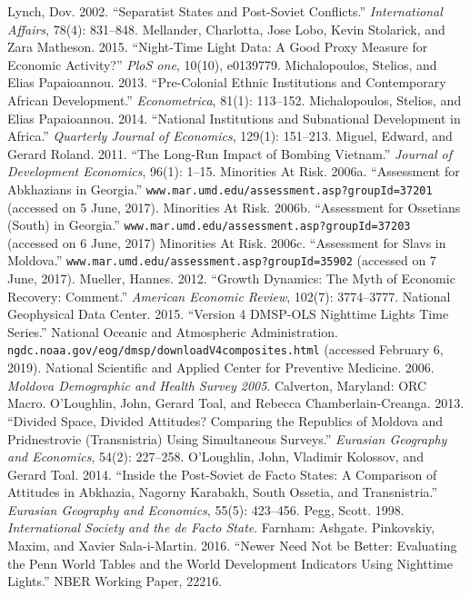 \documentclass[12pt,a4paper]{article}%
\begin{document}
\begin{thebibliography}{99}
\bibitem{} Lynch, Dov. 2002. ``Separatist States and Post-Soviet Conflicts.'' \textit{International Affairs}, 78(4): 831--848.
\bibitem{} Mellander, Charlotta, Jose Lobo, Kevin Stolarick, and Zara Matheson. 2015. ``Night-Time Light Data: A Good Proxy Measure for Economic Activity?'' \textit{PloS one}, 10(10), e0139779.
\bibitem{} Michalopoulos, Stelios, and Elias Papaioannou. 2013. ``Pre-Colonial Ethnic Institutions and Contemporary African Development.'' \textit{Econometrica}, 81(1): 113--152.
\bibitem{} Michalopoulos, Stelios, and Elias Papaioannou. 2014. ``National Institutions and Subnational Development in Africa.'' \textit{Quarterly Journal of Economics}, 129(1): 151--213.
\bibitem{} Miguel, Edward, and Gerard Roland. 2011. ``The Long-Run Impact of Bombing Vietnam.'' \textit{Journal of Development Economics}, 96(1): 1--15.
\bibitem{} Minorities At Risk. 2006a. ``Assessment for Abkhazians in Georgia.'' \verb!www.mar.umd.edu/assessment.asp?groupId=37201! (accessed on 5 June, 2017).
\bibitem{} Minorities At Risk. 2006b. ``Assessment for Ossetians (South) in Georgia.'' \verb!www.mar.umd.edu/assessment.asp?groupId=37203!  (accessed on 6 June, 2017)
\bibitem{} Minorities At Risk. 2006c. ``Assessment for Slavs in Moldova.'' \verb!www.mar.umd.edu/assessment.asp?groupId=35902! (accessed on 7 June, 2017).
\bibitem{} Mueller, Hannes. 2012. ``Growth Dynamics: The Myth of Economic Recovery: Comment.'' \textit{American Economic Review}, 102(7): 3774--3777.
\bibitem{} National Geophysical Data Center. 2015. ``Version 4 DMSP-OLS Nighttime Lights Time Series.'' National Oceanic and Atmospheric Administration. \verb!ngdc.noaa.gov/eog/dmsp/downloadV4composites.html! (accessed February 6, 2019).
\bibitem{} National Scientific and Applied Center for Preventive Medicine. 2006. \textit{Moldova Demographic and Health Survey 2005}. Calverton, Maryland: ORC Macro.
\bibitem{} O'Loughlin, John, Gerard Toal, and Rebecca Chamberlain-Creanga. 2013. ``Divided Space, Divided Attitudes? Comparing the Republics of Moldova and Pridnestrovie (Transnistria) Using Simultaneous Surveys.'' \textit{Eurasian Geography and Economics}, 54(2): 227--258.
\bibitem{} O'Loughlin, John, Vladimir Kolossov, and Gerard Toal. 2014. ``Inside the Post-Soviet de Facto States: A Comparison of Attitudes in Abkhazia, Nagorny Karabakh, South Ossetia, and Transnistria.'' \textit{Eurasian Geography and Economics}, 55(5): 423--456.
\bibitem{} Pegg, Scott. 1998. \textit{International Society and the de Facto State}. Farnham: Ashgate.
\bibitem{} Pinkovskiy, Maxim, and Xavier Sala-i-Martin. 2016. ``Newer Need Not be Better: Evaluating the Penn World Tables and the World Development Indicators Using Nighttime Lights.'' NBER Working Paper, 22216.

\end{thebibliography}
\end{document}
